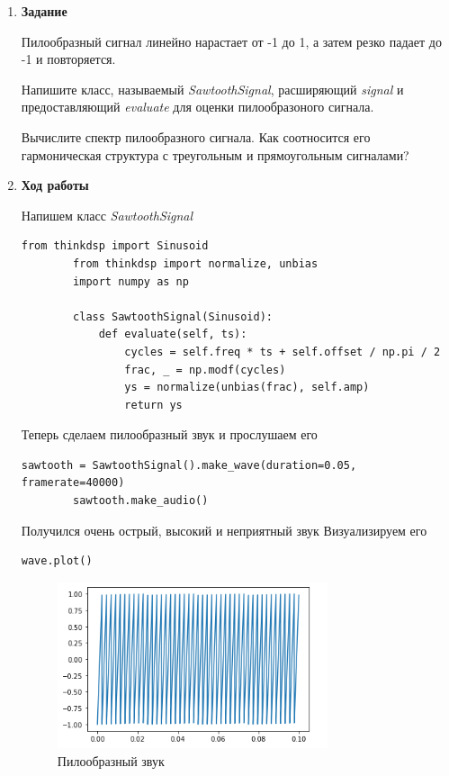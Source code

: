 \documentclass[a4paper,12pt]{article}
\begin{document}
\begin{enumerate}
	
	\item \textbf{Задание}
	
	Пилообразный сигнал линейно нарастает от -1 до 1, а затем резко падает до -1 и повторяется.
	
	Напишите класс, называемый \textit{SawtoothSignal}, расширяющий \textit{signal} и предоставляющий \textit{evaluate} для оценки пилообразоного сигнала.
	
	Вычислите спектр пилообразного сигнала. Как соотносится его гармоническая структура с треугольным и прямоугольным сигналами?
	
	\item \textbf{Ход работы}
	
	Напишем класс \textit{SawtoothSignal}
	
	\begin{lstlisting}[caption=Класс SawtoothSignal]
		from thinkdsp import Sinusoid
		from thinkdsp import normalize, unbias
		import numpy as np
		
		class SawtoothSignal(Sinusoid):
			def evaluate(self, ts):
				cycles = self.freq * ts + self.offset / np.pi / 2
				frac, _ = np.modf(cycles)
				ys = normalize(unbias(frac), self.amp)
				return ys
	\end{lstlisting}
	
	Теперь сделаем пилообразный звук и прослушаем его
	\begin{lstlisting}[caption=Класс SawtoothSignal]
		sawtooth = SawtoothSignal().make_wave(duration=0.05, framerate=40000)
		sawtooth.make_audio()
	\end{lstlisting}
	
	Получился очень острый, высокий и неприятный звук
	Визуализируем его
	
	\begin{lstlisting}[caption=Визуализация звука]
		wave.plot()
	\end{lstlisting}
	\begin{figure}[H]
		\centering
		\includegraphics[width=0.75\textwidth]{2_1.png}
		\caption{Пилообразный звук}
		\label{fig:2.1}
	\end{figure}


\end{enumerate}
\end{document}
